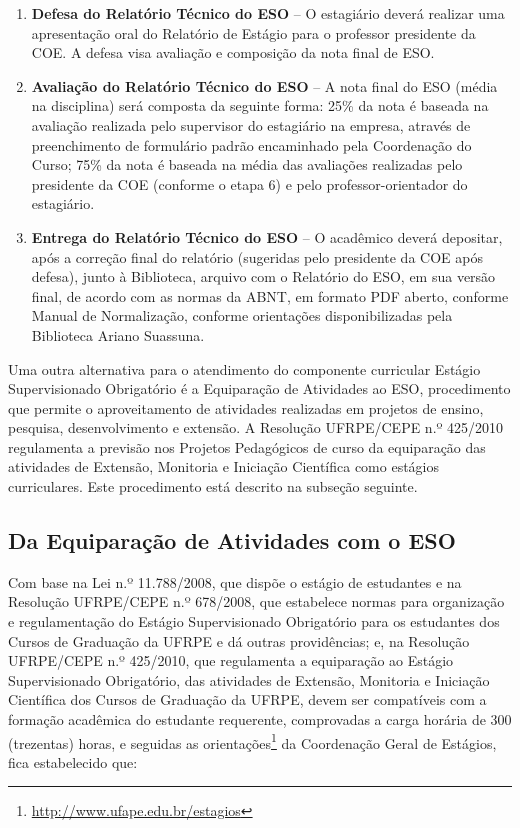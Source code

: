 \documentclass[
	12pt,				%
	openright,			%
  oneside,     %
	a4paper,			%
	english,			%
	french,				%
	spanish,			%
	brazil				%
	]{abntex2}
\begin{document}
\begin{enumerate}
    \item \textbf{Defesa do Relatório Técnico do ESO} – O estagiário deverá realizar uma apresentação oral do Relatório de Estágio para o professor presidente da COE. A defesa visa avaliação e composição da nota final de ESO.
    \item \textbf{Avaliação do Relatório Técnico do ESO} – A nota final do ESO (média na disciplina) será composta da seguinte forma: 25\% da nota é baseada na avaliação realizada pelo supervisor do estagiário na empresa, através de preenchimento de formulário padrão encaminhado pela Coordenação do Curso; 75\% da nota é baseada na média das avaliações realizadas pelo presidente da COE (conforme o etapa 6) e pelo professor-orientador do estagiário.
    \item \textbf{Entrega do Relatório Técnico do ESO} – O acadêmico deverá depositar, após a correção final do relatório (sugeridas pelo presidente da COE após defesa), junto à Biblioteca, arquivo com o Relatório do ESO, em sua versão final, de acordo com as normas da ABNT, em formato PDF aberto, conforme Manual de Normalização, conforme orientações disponibilizadas pela Biblioteca Ariano Suassuna.
\end{enumerate}

Uma outra alternativa para o atendimento do componente curricular Estágio Supervisionado Obrigatório é a Equiparação de Atividades ao ESO, procedimento que permite o aproveitamento de atividades realizadas em projetos de ensino, pesquisa, desenvolvimento e extensão. A Resolução UFRPE/CEPE n.º 425/2010 regulamenta a previsão nos Projetos Pedagógicos de curso da equiparação das atividades de Extensão, Monitoria e Iniciação Científica como estágios curriculares. Este procedimento está descrito na subseção seguinte.

\subsection{Da Equiparação de Atividades com o ESO}

Com base na Lei n.º 11.788/2008, que dispõe o estágio de estudantes e na Resolução UFRPE/CEPE n.º 678/2008, que estabelece normas para organização e regulamentação do Estágio Supervisionado Obrigatório para os estudantes dos Cursos de Graduação da UFRPE e dá outras providências; e, na Resolução UFRPE/CEPE n.º 425/2010, que regulamenta a equiparação ao Estágio Supervisionado Obrigatório, das atividades de Extensão, Monitoria e Iniciação Científica dos Cursos de Graduação da UFRPE, devem ser compatíveis com a formação acadêmica do estudante requerente, comprovadas a carga horária de 300 (trezentas) horas, e seguidas as orientações\footnote{\href{http://www.ufape.edu.br/estagios}{http://www.ufape.edu.br/estagios}} da Coordenação Geral de Estágios, fica estabelecido que:
\end{document}
